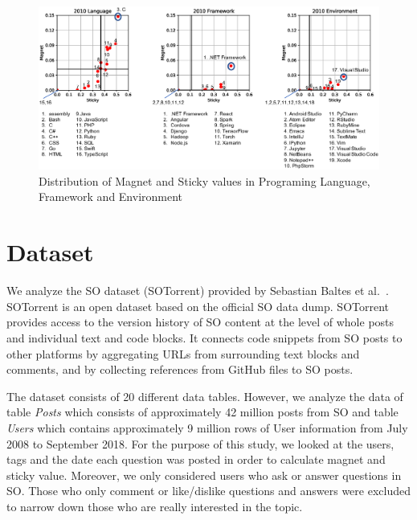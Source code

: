 \documentclass[conference]{IEEEtran}
\begin{document}
\begin{figure}[t]
 \centering
 \includegraphics[width=1.0\hsize]{img/2010allnew.eps}  
 \caption{Distribution of Magnet and Sticky values in Programing Language, Framework and Environment} 
 \label{fig:2010} 
\end{figure}


\section{Dataset}
We analyze the SO dataset (SOTorrent) provided by Sebastian Baltes et al.~\cite{baltes2018sotorrent}. SOTorrent is an open dataset based on the official SO data dump. SOTorrent provides access to the version history of SO content at the level of whole posts and individual text and code blocks. It connects code snippets from SO posts to other platforms by aggregating URLs from surrounding text blocks and comments, and by collecting references from GitHub files to SO posts.

The dataset consists of 20 different data tables.
However, we analyze the data of table \emph{Posts} which consists of approximately 42 million posts from SO and table \emph{Users} which contains approximately 9 million rows of User information from July 2008 to September 2018. For the purpose of this study, we looked at the users, tags and the date each question was posted in order to calculate magnet and sticky value. Moreover, we only considered users who ask or answer questions in SO. Those who only comment or like/dislike questions and answers were excluded to narrow down those who are really interested in the topic.
\end{document}

